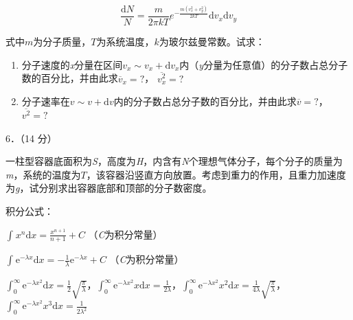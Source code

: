 \documentclass[fontset=exam]{exam-zh}
\begin{document}
\[\frac{\text{d}N}{N} = \frac{m}{2\pi kT}e^{- \frac{m(v_{x}^{2} + v_{y}^{2})}{2kT}}\text{d}v_{x}\text{d}v_{y}\]

式中\(m\)为分子质量，\(T\)为系统温度，\(k\)为玻尔兹曼常数。试求：

\begin{enumerate}
\def\labelenumi{\arabic{enumi}.}
\item
  分子速度的\emph{x}分量在区间\(\left. v_{x} \right.\sim v_{x} + \text{d}v_{x}\)内（\emph{y}分量为任意值）的分子数占总分子数的百分比，并由此求\({\overline{v}}_{x} = ?\)， \(\overline{v_{x}^{2}} = ?\)
\item
  分子速率在\(\left. v \right.\sim v + \text{d}v\)内的分子数占总分子数的百分比，并由此求\(\overline{v} = ?\)，\(\overline{v_{}^{2}} = ?\)
\end{enumerate}

6．（14 分）

一柱型容器底面积为\emph{S}，高度为\emph{H}，内含有\emph{N}个理想气体分子，每个分子的质量为\emph{m}，系统的温度为\(T\)，该容器沿竖直方向放置。考虑到重力的作用，且重力加速度为\emph{g}，试分别求出容器底部和顶部的分子数密度。

积分公式：

\({\int_{}^{}{x^{n}\text{d}x}} = \frac{x^{n + 1}}{n + 1} + C\) （\emph{C}为积分常量）

\({\int_{}^{}{\text{e}^{- \lambda x}\text{d}x}} = - \frac{1}{\lambda}\text{e}^{- \lambda x} + C\) （\emph{C}为积分常量）

\({\int_{0}^{\infty}{\text{e}^{- \lambda x^{2}}\text{d}x}} = \frac{1}{2}\sqrt{\frac{\pi}{\lambda}}\)，\({\int_{0}^{\infty}{\text{e}^{- \lambda x^{2}}x\text{d}x}} = \frac{1}{2\lambda}\)，\({\int_{0}^{\infty}{\text{e}^{- \lambda x^{2}}x^{2}\text{d}x}} = \frac{1}{4\lambda}\sqrt{\frac{\pi}{\lambda}}\)，\({\int_{0}^{\infty}{\text{e}^{- \lambda x^{2}}x^{3}\text{d}x}} = \frac{1}{2\lambda^{2}}\)
\end{document}
